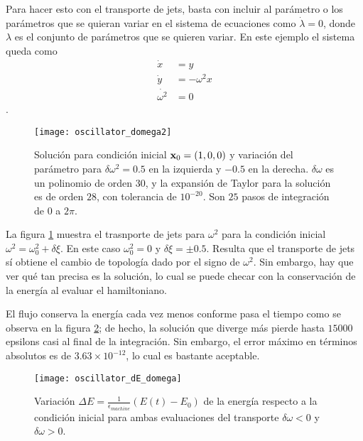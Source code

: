 Para hacer esto con el transporte de jets, basta con incluir al parámetro o los parámetros que se quieran variar en el sistema de ecuaciones como $\dot{\lambda} = 0$, donde $\lambda$ es el conjunto de parámetros que se quieren variar. En este ejemplo el sistema queda como
\begin{align*}
 \dot{x} &= y \\
 \dot{y} &= - \omega^2 x \\
 \dot{\omega^2} &= 0
\end{align*}.
 
\begin{figure}[h!]
 \centering 
 \texttt{[image: oscillator\_domega2]}
 \caption{Solución para condición inicial $\mathbf{x}_0 = (1,0,0)$ y variación del parámetro para $\delta \omega^2 = 0.5$ en la izquierda y $-0.5$ en la derecha. $\delta \omega$ es un polinomio de orden $30$, y la expansión de Taylor para la solución es de orden $28$, con tolerancia de $10^{-20}$. Son $25$ pasos de integración de $0$ a $2 \pi$.}
 \label{fig:oscillator_param_transport}
\end{figure}

La figura \ref{fig:oscillator_param_transport} muestra el trasnporte de jets para $\omega^2$ para la condición inicial $\omega^2 = \omega_0^2 + \delta \xi$. En este caso $\omega_0^2 = 0$ y $\delta\xi = \pm 0.5$. Resulta que el transporte de jets sí obtiene el cambio de topología dado por el signo de $\omega^2$. Sin embargo, hay que ver qué tan precisa es la solución, lo cual se puede checar con la conservación de la energía al evaluar el hamiltoniano. 

El flujo conserva la energía cada vez menos conforme pasa el tiempo como se observa en la figura \ref{fig:oscillator_dE_domega}; de hecho, la solución que diverge más pierde hasta $15000$ epsilons casi al final de la integración. Sin embargo, el error máximo en términos absolutos es de $3.63 \times 10^{-12}$, lo cual es bastante aceptable.

\begin{figure}[h!]
 \centering
 \texttt{[image: oscillator\_dE\_domega]}
 \caption{Variación $\Delta E = \frac{1}{\epsilon_{machine}} \left( E(t) - E_0 \right)$ de la energía respecto a la condición inicial para ambas evaluaciones del transporte $\delta \omega < 0$ y $\delta \omega > 0$.}
 \label{fig:oscillator_dE_domega}
\end{figure}


